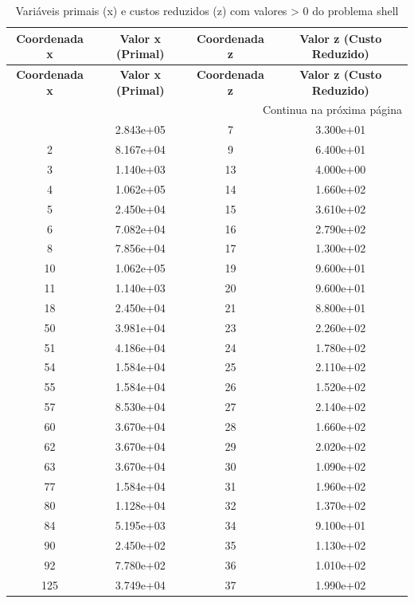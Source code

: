 \documentclass[12pt]{article}
\begin{document}
\begin{longtable}{@{}cccc@{}}
\caption{Variáveis primais (x) e custos reduzidos (z) com valores > 0 do problema shell} \\
\toprule
\textbf{Coordenada x} & \textbf{Valor x (Primal)} & \textbf{Coordenada z} & \textbf{Valor z (Custo Reduzido)} \\
\midrule
\endfirsthead

\toprule
\textbf{Coordenada x} & \textbf{Valor x (Primal)} & \textbf{Coordenada z} & \textbf{Valor z (Custo Reduzido)} \\
\midrule
\endhead

\midrule \multicolumn{4}{r}{{Continua na próxima página}} \\ \midrule
\endfoot

\bottomrule
\endlastfoot
1 & 2.843e+05 & 7 & 3.300e+01 \\
2 & 8.167e+04 & 9 & 6.400e+01 \\
3 & 1.140e+03 & 13 & 4.000e+00 \\
4 & 1.062e+05 & 14 & 1.660e+02 \\
5 & 2.450e+04 & 15 & 3.610e+02 \\
6 & 7.082e+04 & 16 & 2.790e+02 \\
8 & 7.856e+04 & 17 & 1.300e+02 \\
10 & 1.062e+05 & 19 & 9.600e+01 \\
11 & 1.140e+03 & 20 & 9.600e+01 \\
18 & 2.450e+04 & 21 & 8.800e+01 \\
50 & 3.981e+04 & 23 & 2.260e+02 \\
51 & 4.186e+04 & 24 & 1.780e+02 \\
54 & 1.584e+04 & 25 & 2.110e+02 \\
55 & 1.584e+04 & 26 & 1.520e+02 \\
57 & 8.530e+04 & 27 & 2.140e+02 \\
60 & 3.670e+04 & 28 & 1.660e+02 \\
62 & 3.670e+04 & 29 & 2.020e+02 \\
63 & 3.670e+04 & 30 & 1.090e+02 \\
77 & 1.584e+04 & 31 & 1.960e+02 \\
80 & 1.128e+04 & 32 & 1.370e+02 \\
84 & 5.195e+03 & 34 & 9.100e+01 \\
90 & 2.450e+02 & 35 & 1.130e+02 \\
92 & 7.780e+02 & 36 & 1.010e+02 \\
125 & 3.749e+04 & 37 & 1.990e+02 \\

\end{longtable}
\end{document}
